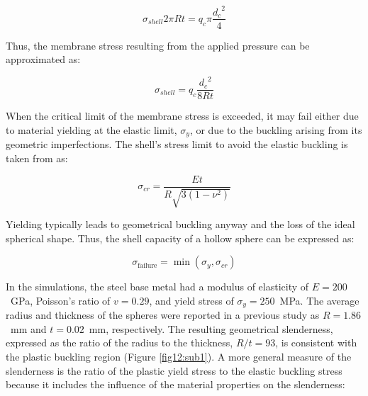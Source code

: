 \documentclass[review]{elsarticle}
\begin{document}
\begin{equation}\label{Eq1}
\sigma_{shell}2\pi Rt=q_c\pi \frac{{d_c}^{2}}{4}
\end{equation}

Thus, the membrane stress resulting from the applied pressure can be approximated as:

\begin{equation}\label{Eq2}
\sigma_{shell}=q_c\frac{{d_c}^{2}}{8Rt}
\end{equation}

When the critical limit of the membrane stress is exceeded, it may fail either due to material yielding at the elastic limit, $\sigma_y$, or due to the buckling arising from its geometric imperfections. The shell's stress limit to avoid the elastic buckling is taken from \cite{TimGer2009} as:

\begin{equation}\label{Eq3}
\sigma_{cr}=\frac{Et}{R\sqrt{3(1-\nu^2)}}
\end{equation}

Yielding typically leads to geometrical buckling anyway and the loss of the ideal spherical shape. Thus, the shell capacity of a hollow sphere can be expressed as:

\begin{equation}\label{Eq4}
\sigma_\text{failure}=\min(\sigma_y,\sigma_{cr})
\end{equation}

In the simulations, the steel base metal had a modulus of elasticity of $E=200$~GPa, Poisson's ratio of $v=0.29$, and yield stress of $\sigma_y=250$~MPa. The average radius and thickness of the spheres were reported in a previous study \cite{Szyniszewskietal2014} as $R = 1.86$~mm and $t = 0.02$~mm, respectively. The resulting geometrical slenderness, expressed as the ratio of the radius to the thickness, $R/t = 93$, is consistent with the plastic buckling region (Figure \ref{fig12:sub1}). A more general measure of the slenderness is the ratio of the plastic yield stress to the elastic buckling stress because it includes the influence of the material properties on the slenderness:
\end{document}
